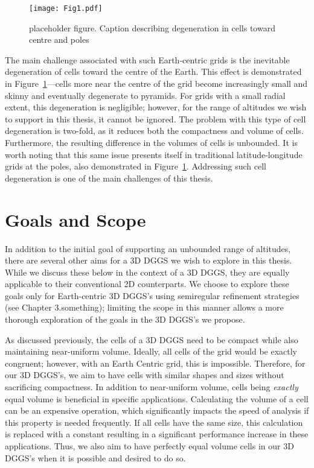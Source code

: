 \begin{figure}[h]
	\texttt{[image: Fig1.pdf]}
	\caption{placeholder figure.
		Caption describing degeneration in cells toward centre and poles}
	\label{fig:3dllg}
\end{figure}


The main challenge associated with such Earth-centric grids is the inevitable degeneration of cells toward the centre of the Earth.
This effect is demonstrated in Figure~\ref{fig:3dllg}---cells more near the centre of the grid become increasingly small and skinny and eventually degenerate to pyramids.
For grids with a small radial extent, this degeneration is negligible; however, for the range of altitudes we wish to support in this thesis, it cannot be ignored.
The problem with this type of cell degeneration is two-fold, as it reduces both the compactness and volume of cells. 
Furthermore, the resulting difference in the volumes of cells is unbounded.
It is worth noting that this same issue presents itself in traditional latitude-longitude grids at the poles, also demonstrated in Figure~\ref{fig:3dllg}.
Addressing such cell degeneration is one of the main challenges of this thesis.


\section{Goals and Scope}
In addition to the initial goal of supporting an unbounded range of altitudes, there are several other aims for a 3D DGGS we wish to explore in this thesis.
While we discuss these below in the context of a 3D DGGS, they are equally applicable to their conventional 2D counterparts.
We choose to explore these goals only for Earth-centric 3D DGGS's using semiregular refinement strategies (see Chapter 3.something); limiting the scope in this manner allows a more thorough exploration of the goals in the 3D DGGS's we propose.


As discussed previously, the cells of a 3D DGGS need to be compact while also maintaining near-uniform volume.
Ideally, all cells of the grid would be exactly congruent; however, with an Earth Centric grid, this is impossible.
Therefore, for our 3D DGGS's, we aim to have cells with similar shapes and sizes without sacrificing compactness.
In addition to near-uniform volume, cells being \textit{exactly} equal volume is beneficial in specific applications.
Calculating the volume of a cell can be an expensive operation, which significantly impacts the speed of analysis if this property is needed frequently.
If all cells have the same size, this calculation is replaced with a constant resulting in a significant performance increase in these applications.
Thus, we also aim to have perfectly equal volume cells in our 3D DGGS's when it is possible and desired to do so.


